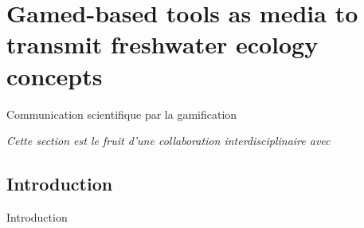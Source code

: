 


\newpage


\section{Gamed-based tools as media to transmit freshwater ecology concepts}{Communication scientifique par la gamification}

\label{app:sec:mediationecotox}





\stars

\textit{Cette section est le fruit d'une collaboration interdisciplinaire avec }


\stars



\subsection{Introduction}{Introduction}


